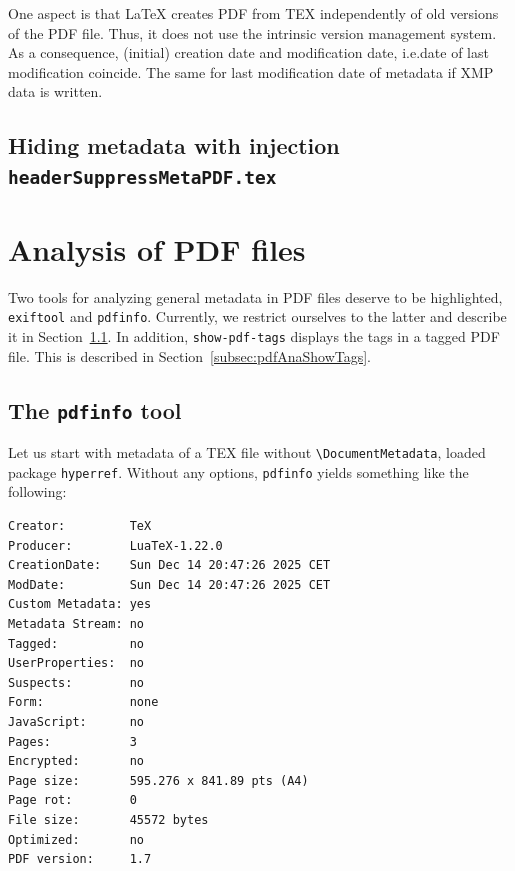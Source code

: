 \documentclass[a4paper, USenglish]{article}%
\makeatletter
\newcommand{\cmd}[2][]{\texttt{\textbackslash{}#2#1}}
\newcommand{\pkg}[1]{\texttt{#1}}%
\newcommand{\cmd}[2][]{\texttt{\textbackslash{}#2#1}\sindex[cmd]{#2@\texttt{\textbackslash{}#2}}}%
\newcommand{\pkg}[2][]{\texorpdfstring{\texttt{#2}\sindex[pkg]{#2@\texttt{#2}}}{xxx}} %
\makeatother
\begin{document}
One aspect is that \LaTeX{} creates PDF from TEX independently of old versions of the PDF file. 
Thus, it does not use the intrinsic version management system. 
As a consequence, (initial) creation date and modification date, i.e.\@ date of last modification coincide. 
The same for last modification date of metadata if XMP data is written. 


\subsection{Hiding metadata with injection \texttt{headerSuppressMetaPDF.tex}}\label{subsec:hide}



\section{Analysis of PDF files}\label{sec:pdfAna}

Two tools for analyzing general metadata in PDF files deserve to be highlighted, \texttt{exiftool} and \texttt{pdfinfo}. 
Currently, we restrict ourselves to the latter and describe it in Section~\ref{subsec:pdfAnaPdfInfo}. 
In addition, \texttt{show-pdf-tags} displays the tags in a tagged PDF file. 
This is described in Section~\ref{subsec:pdfAnaShowTags}. 


\subsection{The \texttt{pdfinfo} tool}\label{subsec:pdfAnaPdfInfo}

Let us start with metadata of a TEX file without \cmd{DocumentMetadata}, loaded package \pkg{hyperref}. 
Without any options, \texttt{pdfinfo} yields something like the following: 

\begin{verbatim}
Creator:         TeX
Producer:        LuaTeX-1.22.0
CreationDate:    Sun Dec 14 20:47:26 2025 CET
ModDate:         Sun Dec 14 20:47:26 2025 CET
Custom Metadata: yes
Metadata Stream: no
Tagged:          no
UserProperties:  no
Suspects:        no
Form:            none
JavaScript:      no
Pages:           3
Encrypted:       no
Page size:       595.276 x 841.89 pts (A4)
Page rot:        0
File size:       45572 bytes
Optimized:       no
PDF version:     1.7
\end{verbatim}
\end{document}
